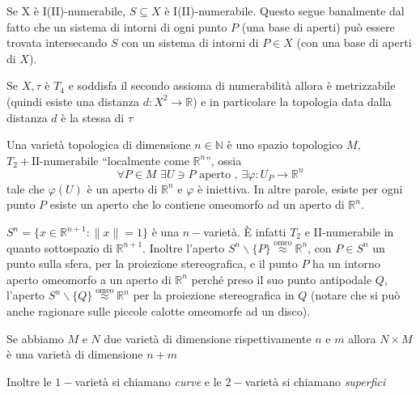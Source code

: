 \begin{remark}
    Se X è I(II)-numerabile, \(S \subseteq X \) è I(II)-numerabile. Questo segue
    banalmente dal fatto che un sistema di intorni di ogni punto \(P\) (una base
    di aperti) può essere trovata intersecando \(S\) con un sistema di intorni
    di \(P \in X\) (con una base di aperti di \(X\)).
\end{remark}
\begin{theorem}
    Se \(X, \tau\) è \(T_{4}\) e soddisfa il secondo assioma di numerabilità allora è
    metrizzabile (quindi esiste una distanza \(d: X^2 \to  \mathbb{R}\)) e in
    particolare la topologia data dalla distanza \(d\) è la stessa di \(\tau\) 
\end{theorem}
\begin{definition}
    Una varietà topologica di dimensione \(n \in \mathbb{N}\) è uno spazio
    topologico \(M\),  \(T_{2} + \text{II-numerabile}\) ``localmente come
    \(\mathbb{R}^{n}\)'', ossia
    \[
        \forall P \in M\,\,\exists U \ni P \text{ aperto },\,\exists \varphi :
        U_P \to \mathbb{R}^{n}
    \]
    tale che \(\varphi(U)\) è un aperto di \(\mathbb{R}^{n}\) e \(\varphi\) è
    iniettiva. In
    altre parole, esiste per ogni punto \(P\) esiste un aperto che lo contiene
    omeomorfo ad un aperto di \(\mathbb{R}^{n}\).
\end{definition}

\begin{example}
    \(S^{n} = \{x \in \mathbb{R}^{n+1} : \|x\| = 1\} \) è una \(n-\)varietà. È
    infatti \(T_{2}\) e II-numerabile in quanto sottospazio di
    \(\mathbb{R}^{n+1}\).
    Inoltre l'aperto \(S^{n} \smallsetminus \{P\} \stackrel{\text{omeo}}{\approx }
    \mathbb{R}^{n}\), con \(P \in S^{n}\) un punto sulla sfera, per la
    proiezione stereografica, e il punto \(P\) ha un intorno aperto omeomorfo a un
    aperto di \(\mathbb{R}^{n}\) perché preso il suo punto antipodale \(Q\),
    l'aperto \(S^{n} \smallsetminus \{Q\} \stackrel{\text{omeo}}{\approx}
    \mathbb{R}^{n}\) per la proiezione stereografica in \(Q\) (notare che si può anche
    ragionare sulle piccole calotte omeomorfe ad un disco).
\end{example}
\begin{example}
    Se abbiamo \(M\) e \(N\) due varietà di dimensione rispettivamente \(n\) e
    \(m\) allora \(N \times M\) è una varietà di dimensione \(n+m\) 
\end{example}
Inoltre le \(1-\)varietà si chiamano \emph{curve} e le \(2-\)varietà si chiamano
\emph{superfici}

